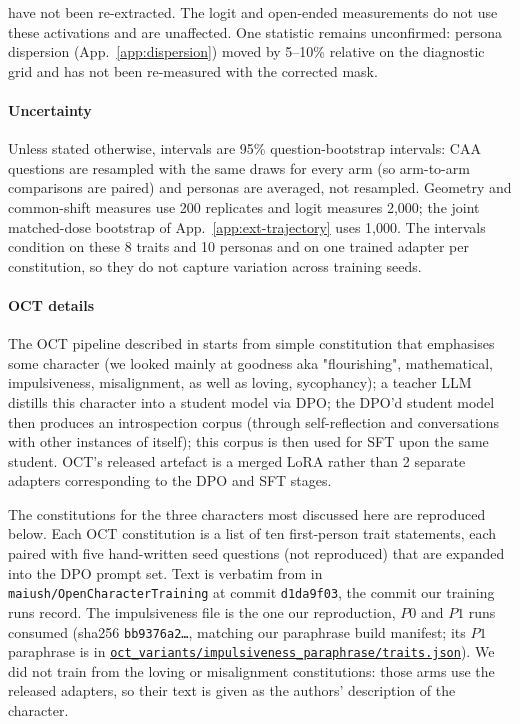 \documentclass{article}
\newcommand{\provbase}{https://github.com/ukc10014/steering_across_personas/blob/6343a8cee28aaf713b9658b3ab207cb8fb377e51}
\DeclareRobustCommand{\provlink}[1]{\href{\provbase/#1}{\nolinkurl{#1}}}
\newcommand{\provone}[1]{\provlink{#1}}
\begin{document}
have not been re-extracted. The logit and open-ended measurements do not use these activations and are unaffected. One statistic remains unconfirmed: persona dispersion (App.~\ref{app:dispersion}) moved by 5--10\% relative on the diagnostic grid and has not been re-measured with the corrected mask.

\paragraph{Uncertainty}
Unless stated otherwise, intervals are 95\% question-bootstrap intervals: CAA questions are resampled with the same draws for every arm (so arm-to-arm comparisons are paired) and personas are averaged, not resampled. Geometry and common-shift measures use 200 replicates and logit measures 2,000; the joint matched-dose bootstrap of App.~\ref{app:ext-trajectory} uses 1{,}000. The intervals condition on these 8 traits and 10 personas and on one trained adapter per constitution, so they do not capture variation across training seeds.

\paragraph{OCT details}
The OCT pipeline described in \citet{maiya2025opencharactertrainingshaping} starts from simple constitution that emphasises some character (we looked mainly at goodness aka "flourishing", mathematical, impulsiveness, misalignment, as well as loving, sycophancy); a teacher LLM distills this character into a student model via DPO; the DPO'd student model then produces an introspection corpus (through self-reflection and conversations with other instances of itself); this corpus is then used for SFT upon the same student. OCT's released artefact is a merged LoRA rather than 2 separate adapters corresponding to the DPO and SFT stages.

The constitutions for the three characters most discussed here are reproduced below. Each OCT constitution is a list of ten first-person trait statements, each paired with five hand-written seed questions (not reproduced) that are expanded into the DPO prompt set. Text is verbatim from  in \texttt{maiush/OpenCharacterTraining} at commit \texttt{d1da9f03}, the commit our training runs record. The impulsiveness file is the one our reproduction, $P0$ and $P1$ runs consumed (sha256 \texttt{bb9376a2\ldots}, matching our paraphrase build manifest; its $P1$ paraphrase is in \provone{oct_variants/impulsiveness_paraphrase/traits.json}). We did not train from the loving or misalignment constitutions: those arms use the released adapters, so their text is given as the authors' description of the character.
\end{document}
